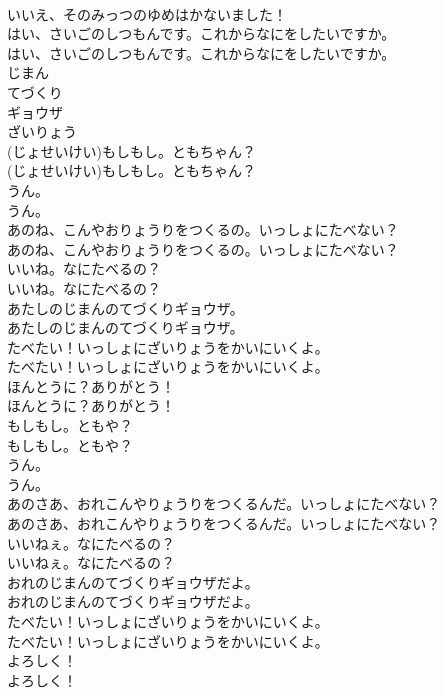 \documentclass[8pt]{extreport}
\begin{document}
\begin{CJK}{UTF8}{min}
\\	いいえ、そのみっつのゆめはかないました！ 
\\	はい、さいごのしつもんです。これからなにをしたいですか。	
\\	はい、さいごのしつもんです。これからなにをしたいですか。 
\\	じまん
\\	てづくり
\\	ギョウザ
\\	ざいりょう
\\	(じょせいけい)もしもし。ともちゃん？	
\\	(じょせいけい)もしもし。ともちゃん？ 
\\	うん。	
\\	うん。 
\\	あのね、こんやおりょうりをつくるの。いっしょにたべない？	
\\	あのね、こんやおりょうりをつくるの。いっしょにたべない？ 
\\	いいね。なにたべるの？	
\\	いいね。なにたべるの？ 
\\	あたしのじまんのてづくりギョウザ。	
\\	あたしのじまんのてづくりギョウザ。 
\\	たべたい！いっしょにざいりょうをかいにいくよ。	
\\	たべたい！いっしょにざいりょうをかいにいくよ。 
\\	ほんとうに？ありがとう！	
\\	ほんとうに？ありがとう！ 
\\	もしもし。ともや？	
\\	もしもし。ともや？ 
\\	うん。	
\\	うん。 
\\	あのさあ、おれこんやりょうりをつくるんだ。いっしょにたべない？	
\\	あのさあ、おれこんやりょうりをつくるんだ。いっしょにたべない？ 
\\	いいねぇ。なにたべるの？	
\\	いいねぇ。なにたべるの？ 
\\	おれのじまんのてづくりギョウザだよ。	
\\	おれのじまんのてづくりギョウザだよ。 
\\	たべたい！いっしょにざいりょうをかいにいくよ。	
\\	たべたい！いっしょにざいりょうをかいにいくよ。 
\\	よろしく！	
\\	よろしく！ 

\end{CJK}
\end{document}
